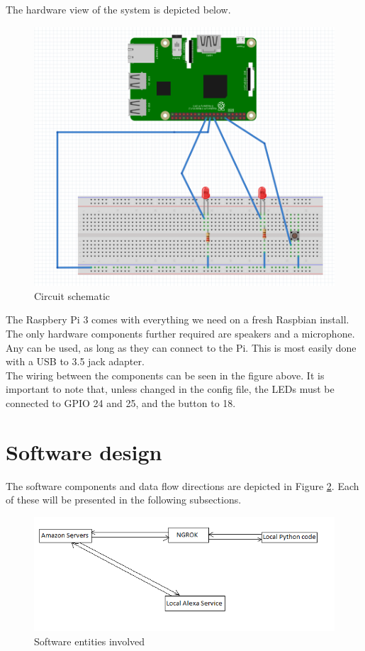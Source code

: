 \documentclass[a4paper,11pt]{article}
\begin{document}
The hardware view of the system is depicted below.

\begin{figure}[h]
\centering
\includegraphics[scale=0.7]{PIC2.png}
\caption{Circuit schematic}
\label{fig:circuit-design}
\end{figure}

The Raspbery Pi 3 comes with everything we need on a fresh Raspbian install.\\

The only hardware components further required are speakers and a microphone. Any can be used, as long as they can connect to the Pi. This is most easily done with a USB to 3.5 jack adapter.\\

The wiring between the components can be seen in the figure above. It is important to note that, unless changed in the config file, the LEDs must be connected to GPIO 24 and 25, and the button to 18.\\

\section{Software design}

The software components and data flow directions are depicted in Figure \ref{fig:soft-design}. Each of these will be presented in the following subsections.\\

\begin{figure}
\centering
\includegraphics[scale=0.7]{PIC3.png}
\caption{Software entities involved}
\label{fig:soft-design}
\end{figure}
 
\end{document}
